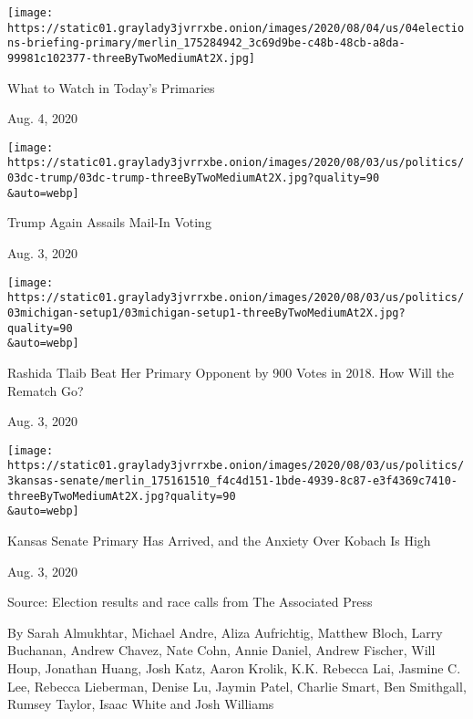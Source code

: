 \texttt{[image: https://static01.graylady3jvrrxbe.onion/images/2020/08/04/us/04elections-briefing-primary/merlin\_175284942\_3c69d9be-c48b-48cb-a8da-99981c102377-threeByTwoMediumAt2X.jpg]}

What to Watch in Today's Primaries

Aug. 4, 2020

\href{https://www.nytimes3xbfgragh.onion/2020/08/03/us/politics/trump-mail-in-voting.html?action=click\&module=ELEX_results\&pgtype=Interactive\&region=RelatedCoverage}{}

\texttt{[image: https://static01.graylady3jvrrxbe.onion/images/2020/08/03/us/politics/03dc-trump/03dc-trump-threeByTwoMediumAt2X.jpg?quality=90\\\&auto=webp]}

Trump Again Assails Mail-In Voting

Aug. 3, 2020

\href{https://www.nytimes3xbfgragh.onion/2020/08/03/us/politics/michigan-primary-rashida-tlaib-brenda-jones.html?action=click\&module=ELEX_results\&pgtype=Interactive\&region=RelatedCoverage}{}

\texttt{[image: https://static01.graylady3jvrrxbe.onion/images/2020/08/03/us/politics/03michigan-setup1/03michigan-setup1-threeByTwoMediumAt2X.jpg?quality=90\\\&auto=webp]}

Rashida Tlaib Beat Her Primary Opponent by 900 Votes in 2018. How Will
the Rematch Go?

Aug. 3, 2020

\href{https://www.nytimes3xbfgragh.onion/2020/08/03/us/politics/kris-kobach-kansas-senate-primary.html?action=click\&module=ELEX_results\&pgtype=Interactive\&region=RelatedCoverage}{}

\texttt{[image: https://static01.graylady3jvrrxbe.onion/images/2020/08/03/us/politics/3kansas-senate/merlin\_175161510\_f4c4d151-1bde-4939-8c87-e3f4369c7410-threeByTwoMediumAt2X.jpg?quality=90\\\&auto=webp]}

Kansas Senate Primary Has Arrived, and the Anxiety Over Kobach Is High

Aug. 3, 2020

Source: Election results and race calls from The Associated Press

By Sarah Almukhtar, Michael Andre, Aliza Aufrichtig, Matthew Bloch,
Larry Buchanan, Andrew Chavez, Nate Cohn, Annie Daniel, Andrew Fischer,
Will Houp, Jonathan Huang, Josh Katz, Aaron Krolik, K.K. Rebecca Lai,
Jasmine C. Lee, Rebecca Lieberman, Denise Lu, Jaymin Patel, Charlie
Smart, Ben Smithgall, Rumsey Taylor, Isaac White and Josh Williams

